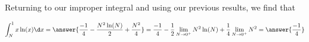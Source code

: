 \documentclass{ximera}
\begin{document}
\begin{exercise}
\begin{exercise}
\begin{exercise}
\begin{exercise}
\begin{exercise}


Returning to our improper integral and using our previous results, we find that 

\[
\int_{N}^{1} x\ln(x) \d x= \answer{\frac{-1}{4} -\frac{N^{2}\ln(N)}{2}+\frac{N^{2}}{4} }=\frac{-1}{4} -\frac{1}{2}\lim_{N \to 0^{+}} N^{2} \ln(N) + \frac{1}{4} \lim_{N \to 0^{+}} N^{2}=\answer{\frac{-1}{4}}
\]



\end{exercise}


\end{exercise}
\end{exercise}

\end{exercise}
\end{exercise}
\end{document}
